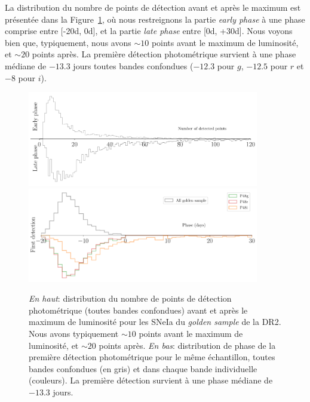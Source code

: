\documentclass[../main/main.tex]{subfiles}
\begin{document}
La distribution du nombre de points de détection avant et après le
maximum est présentée dans la Figure~\ref{fig:earlylatephase}, où nous
restreignons la partie \textit{early phase} à une phase comprise entre
[-20d, 0d], et la partie \textit{late phase} entre [0d, +30d]. Nous
voyons bien que, typiquement, nous avons $\sim10$ points avant le
maximum de luminosité, et $\sim20$ points après. La première détection
photométrique survient à une phase médiane de $-13.3$ jours toutes bandes
confondues ($-12.3$ pour $g$, $-12.5$ pour $r$ et $-8$ pour $i$).
\begin{figure}[ht!]
  \centering
  \includegraphics[width=0.9\textwidth]{../figures/09_dr2/early_late_phase_dr2.pdf}
  \includegraphics[width=0.9\textwidth]{../figures/09_dr2/first_detect_dr2.pdf}
  \caption[Distribution de points de détection avant/après le maximum de
  luminosité et distribution de phase de la première détection du
  \textit{golden sample} de la DR2.]{\emph{En haut}: distribution du
    nombre de
    points de détection photométrique (toutes bandes confondues) avant et après le maximum de
  luminosité pour les SNeIa du
  \textit{golden sample} de la DR2. Nous avons typiquement $\sim10$ points avant le
maximum de luminosité, et $\sim20$ points après. \emph{En bas}:
distribution de phase de la première détection photométrique pour le
même échantillon, toutes bandes confondues (en gris) et dans chaque
bande individuelle (couleurs). La première détection survient à une phase médiane de $-13.3$ jours.}
  \label{fig:earlylatephase}
\end{figure}
\end{document}
